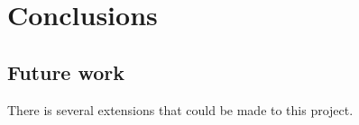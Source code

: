 \chapter{Conclusions}

\section{Future work}
There is several extensions that could be made to this project. 
